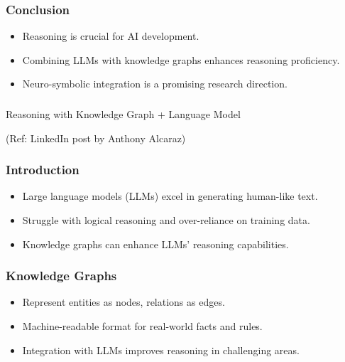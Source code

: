 \begin{frame}[fragile]\frametitle{Conclusion}
    \begin{itemize}
        \item Reasoning is crucial for AI development.
        \item Combining LLMs with knowledge graphs enhances reasoning proficiency.
        \item Neuro-symbolic integration is a promising research direction.
    \end{itemize}
\end{frame}






\begin{frame}[fragile]\frametitle{}
\begin{center}
{\Large Reasoning with Knowledge Graph + Language Model}

{\tiny (Ref: LinkedIn post by Anthony Alcaraz)}
\end{center}
\end{frame}

\begin{frame}[fragile]
\frametitle{Introduction}
\begin{itemize}
    \item Large language models (LLMs) excel in generating human-like text.
    \item Struggle with logical reasoning and over-reliance on training data.
    \item Knowledge graphs can enhance LLMs' reasoning capabilities.
\end{itemize}
\end{frame}

\begin{frame}[fragile]
\frametitle{Knowledge Graphs}
\begin{itemize}
    \item Represent entities as nodes, relations as edges.
    \item Machine-readable format for real-world facts and rules.
    \item Integration with LLMs improves reasoning in challenging areas.
\end{itemize}
\end{frame}

